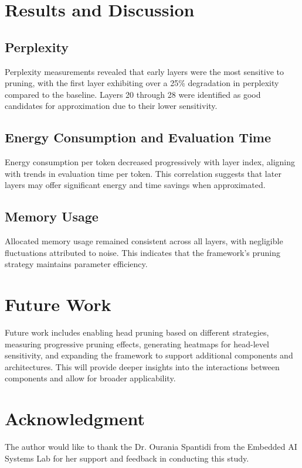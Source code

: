 \documentclass[conference]{IEEEtran}
\begin{document}
    \section{Results and Discussion}
    \subsection{Perplexity}
    Perplexity measurements revealed that early layers were the most sensitive to pruning, with the first layer exhibiting over a 25\% degradation in perplexity compared to the baseline. Layers 20 through 28 were identified as good candidates for approximation due to their lower sensitivity.

    \subsection{Energy Consumption and Evaluation Time}
    Energy consumption per token decreased progressively with layer index, aligning with trends in evaluation time per token. This correlation suggests that later layers may offer significant energy and time savings when approximated.

    \subsection{Memory Usage}
    Allocated memory usage remained consistent across all layers, with negligible fluctuations attributed to noise. This indicates that the framework's pruning strategy maintains parameter efficiency.

    \section{Future Work}
    Future work includes enabling head pruning based on different strategies, measuring progressive pruning effects, generating heatmaps for head-level sensitivity, and expanding the framework to support additional components and architectures. This will provide deeper insights into the interactions between components and allow for broader applicability.

    \section*{Acknowledgment}
    The author would like to thank the Dr. Ourania Spantidi from the Embedded AI Systems Lab for her support and feedback in conducting this study.

    
    
\end{document}
